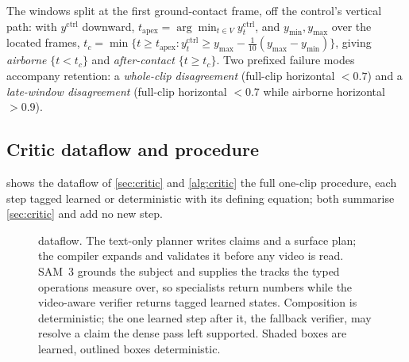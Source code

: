 The windows split at the first ground-contact frame, off the control's vertical path: with
$y^{\mathrm{ctrl}}$ downward, $t_{\mathrm{apex}}=\arg\min_{t\in V} y^{\mathrm{ctrl}}_t$, and
$y_{\min},y_{\max}$ over the located frames,
$t_c=\min\{t\geq t_{\mathrm{apex}}: y^{\mathrm{ctrl}}_t \geq y_{\max}-\tfrac{1}{10}(y_{\max}-y_{\min})\}$,
giving \emph{airborne} $\{t<t_c\}$ and \emph{after-contact} $\{t\geq t_c\}$. Two prefixed failure
modes accompany retention: a \emph{whole-clip disagreement} (full-clip horizontal $<0.7$) and a
\emph{late-window disagreement} (full-clip horizontal $<0.7$ while airborne horizontal $>0.9$).

\subsection{Critic dataflow and procedure}\label{sec:app-critic-alg}
 shows the dataflow of \cref{sec:critic} and \cref{alg:critic} the full one-clip
procedure, each step tagged learned or deterministic with its defining equation; both summarise
\cref{sec:critic} and add no new step.

\begin{figure}[H]
  \centering
  
  \caption{\PhyReAct{} dataflow. The text-only planner writes claims and a surface
  plan; the compiler expands and validates it before any video is read. SAM~3
  grounds the subject and supplies the tracks the typed operations measure over, so
  specialists return numbers while the video-aware verifier returns tagged learned
  states. Composition is deterministic; the one learned step after it, the fallback
  verifier, may resolve a claim the dense pass left supported. Shaded boxes are
  learned, outlined boxes deterministic.}
  \label{fig:criticpipe}
\end{figure}

